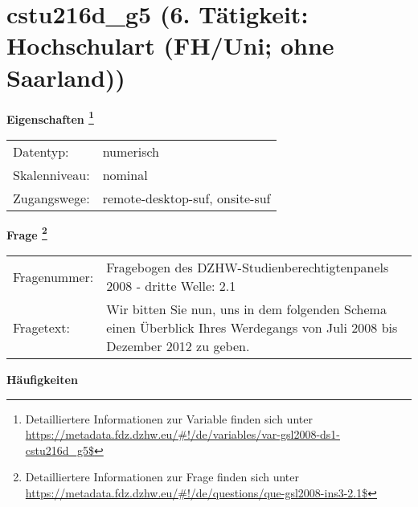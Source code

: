 
    \setcounter{footnote}{0}

    \vspace*{-1.8cm}
	\section{cstu216d\_g5 (6. Tätigkeit: Hochschulart (FH/Uni; ohne Saarland))}
	\label{section:cstu216d_g5}



    \vspace*{0.5cm}
    \noindent\textbf{Eigenschaften
	\footnote{Detailliertere Informationen zur Variable finden sich unter
		\url{https://metadata.fdz.dzhw.eu/\#!/de/variables/var-gsl2008-ds1-cstu216d_g5$}}}\\
	\begin{tabularx}{\hsize}{@{}lX}
	Datentyp: & numerisch \\
	Skalenniveau: & nominal \\
	Zugangswege: &
	  remote-desktop-suf, 
	  onsite-suf
 \\
    \end{tabularx}



				\vspace*{0.5cm}
                \noindent\textbf{Frage
	                \footnote{Detailliertere Informationen zur Frage finden sich unter
		              \url{https://metadata.fdz.dzhw.eu/\#!/de/questions/que-gsl2008-ins3-2.1$}}}\\
				\begin{tabularx}{\hsize}{@{}lX}
					Fragenummer: &
					  Fragebogen des DZHW-Studienberechtigtenpanels 2008 - dritte Welle:
					  2.1
 \\
					Fragetext: & Wir bitten Sie nun, uns in dem folgenden Schema einen Überblick Ihres Werdegangs von Juli 2008 bis Dezember 2012 zu geben. \\
				\end{tabularx}





        		\vspace*{0.5cm}
                \noindent\textbf{Häufigkeiten}

